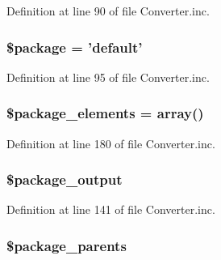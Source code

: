 \-Definition at line 90 of file \-Converter.\-inc.

\hypertarget{class_converter_a365395516cc195292e97e09bc0d165ae}{
\subsubsection[{\$package}]{\setlength{\rightskip}{0pt plus 5cm}\$package = 'default'}}\label{class_converter_a365395516cc195292e97e09bc0d165ae}


\-Definition at line 95 of file \-Converter.\-inc.

\hypertarget{class_converter_a77214bc65f8fe29915139fe0b0044a53}{
\subsubsection[{\$package\-\_\-elements}]{\setlength{\rightskip}{0pt plus 5cm}\$package\-\_\-elements = array()}}\label{class_converter_a77214bc65f8fe29915139fe0b0044a53}


\-Definition at line 180 of file \-Converter.\-inc.

\hypertarget{class_converter_a3e4a95e63781fd6b62f454f84c41c3ae}{
\subsubsection[{\$package\-\_\-output}]{\setlength{\rightskip}{0pt plus 5cm}\$package\-\_\-output}}\label{class_converter_a3e4a95e63781fd6b62f454f84c41c3ae}


\-Definition at line 141 of file \-Converter.\-inc.

\hypertarget{class_converter_acf9ccb8aea606d86cfed6693a6349bc3}{
\subsubsection[{\$package\-\_\-parents}]{\setlength{\rightskip}{0pt plus 5cm}\$package\-\_\-parents}}\label{class_converter_acf9ccb8aea606d86cfed6693a6349bc3}


